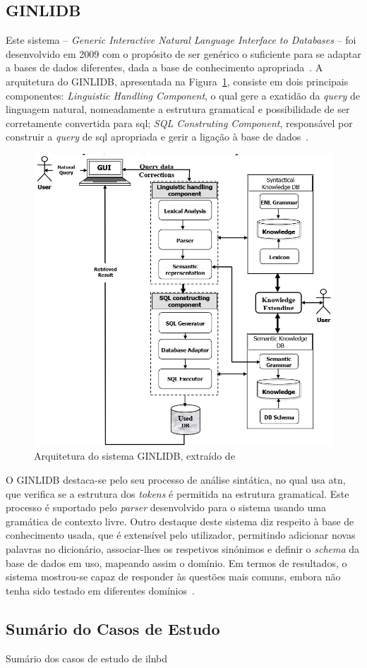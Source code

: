 \subsection{GINLIDB}
Este sistema -- \textit{Generic Interactive Natural Language Interface to Databases} -- foi desenvolvido em 2009 com o propósito de ser genérico o suficiente para se adaptar a bases de dados diferentes, dada a base de conhecimento apropriada~\parencite{ginlidb}. A arquitetura do GINLIDB, apresentada na Figura~\ref{fig:ginlidb_architecture}, consiste em dois principais componentes: \textit{Linguistic Handling Component}, o qual gere a exatidão da \textit{query} de linguagem natural, nomeadamente a estrutura gramatical e possibilidade de ser corretamente convertida para \gls{sql}; \textit{SQL Construting Component}, responsável por construir a \textit{query} de \gls{sql} apropriada e gerir a ligação à base de dados~\parencite{ginlidb}.

\begin{figure}[!ht]
    \centering
    \includegraphics[width=.6\textwidth]{ch03/assets/ginlidb_architecture.jpg}
    \caption{Arquitetura do sistema GINLIDB, extraído de~\textcite{ginlidb}}
    \label{fig:ginlidb_architecture}
\end{figure}

O GINLIDB destaca-se pelo seu processo de análise sintática, no qual usa \gls{atn}, que verifica se a estrutura dos \textit{tokens} é permitida na estrutura gramatical. Este processo é suportado pelo \textit{parser} desenvolvido para o sistema usando uma gramática de contexto livre. Outro destaque deste sistema diz respeito à base de conhecimento usada, que é extensível pelo utilizador, permitindo adicionar novas palavras no dicionário, associar-lhes os respetivos sinónimos e definir o \textit{schema} da base de dados em uso, mapeando assim o domínio. Em termos de resultados, o sistema mostrou-se capaz de responder às questões mais comuns, embora não tenha sido testado em diferentes domínios~\parencite{ginlidb}.

\subsection{Sumário do Casos de Estudo}

\begin{table}[!ht]
\caption{Sumário dos casos de estudo de \gls{ilnbd}}
\label{tab:study_cases}
\centering
\resizebox{\textwidth}{!}{}
\end{table}